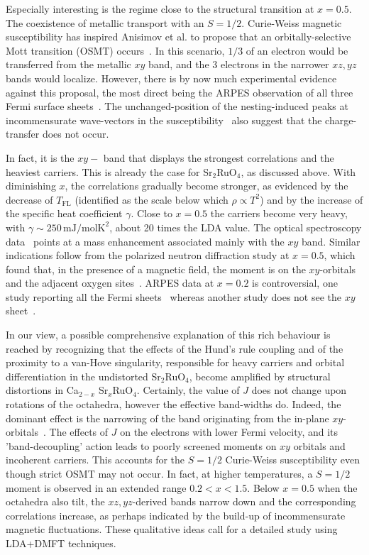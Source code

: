 \documentclass[]{ar2e-changed}%
\begin{document}
Especially interesting is the regime close to the structural transition at
$x=0.5$. The coexistence of metallic transport with an $S=1/2$. 
Curie-Weiss magnetic susceptibility has inspired
Anisimov et al. to propose that an orbitally-selective Mott transition (OSMT) occurs~\cite{Anisimov_OSMT}. 
%
In this scenario,  $1/3$ of an electron would be transferred from the metallic $xy$ band, 
and the 3 electrons in the narrower $xz,yz$ bands would localize. 
%
However, there is by now much experimental evidence against this proposal, 
the most direct being the ARPES observation of all three Fermi
surface sheets~\cite{wang_prl_csro_2004}. 
The unchanged-position of the nesting-induced peaks at incommensurate wave-vectors 
in the susceptibility~\cite{steffens_prb_2011} also suggest that the charge-transfer does not occur. 

In fact, it is the $xy-$ band that displays the strongest correlations and the 
heaviest carriers. This is already the case for Sr$_2$RuO$_4$, as discussed above. 
%
With diminishing $x$, the correlations gradually become
stronger, as evidenced by the decrease of $T_\mathrm{FL}$ 
(identified as the scale below which $\rho \propto T^2$) and by the increase of the
specific heat coefficient $\gamma$. Close to $x=0.5$ the carriers
become very heavy, with $\gamma\sim 250$\,$\mathrm{mJ/molK^2}$, about
20 times the LDA value. The optical spectroscopy
data~\cite{lee_prl_2006} points at a mass enhancement associated mainly with 
the $xy$ band. Similar indications follow from the polarized neutron diffraction study at $x=0.5$, 
which found that, in the presence of a magnetic field, the moment is on the 
$xy$-orbitals and the adjacent oxygen
sites~\cite{gukasov_prl_2002}. ARPES data at $x=0.2$ is controversial,
one study reporting all the Fermi sheets~\cite{shimoyamada_prl_2009}
whereas another study does not see the $xy$ sheet~\cite{neupane_prl_2009}.

In our view, a possible comprehensive explanation of this rich behaviour is reached
by recognizing that the effects of the Hund's rule coupling and of the
proximity to a van-Hove singularity, responsible for heavy carriers
and orbital differentiation in the undistorted Sr$_2$RuO$_4$, become
amplified by structural distortions in Ca$_{2-x}$ Sr$_{x}$RuO$_4$. 
%
Certainly, the value of $J$ does not change upon rotations of the octahedra, 
however the effective band-widths do.  Indeed, the dominant effect is the 
narrowing of the band originating from the in-plane $xy$-orbitals~\cite{fang_prb_2001}. 
%
The effects of $J$ on the electrons with lower Fermi velocity, and its 'band-decoupling' action leads to poorly
screened moments on $xy$ orbitals and incoherent carriers. This accounts for the $S=1/2$ Curie-Weiss
susceptibility even though strict OSMT may not occur. In fact, at
higher temperatures, a $S=1/2$ moment is observed in an extended range
$0.2<x<1.5$. Below $x=0.5$ when the octahedra also tilt, the
$xz,yz$-derived bands narrow down and the corresponding correlations
increase, as perhaps indicated by the build-up of incommensurate
magnetic fluctuations.
%
These qualitative ideas call for a detailed study using LDA+DMFT techniques. 
\end{document}

